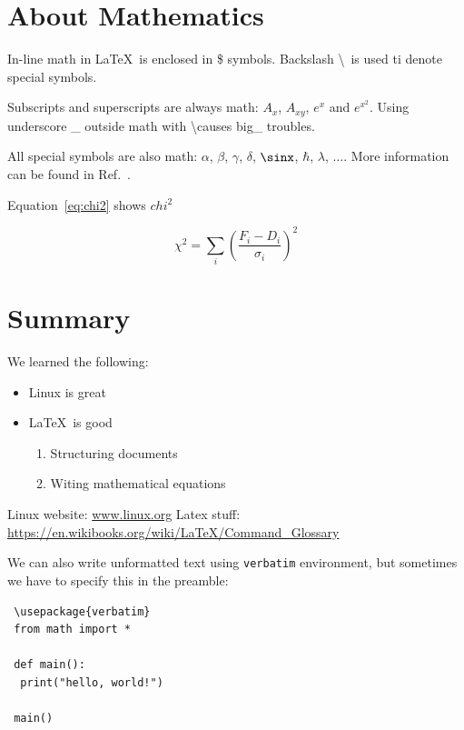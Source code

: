 \documentclass[a4paper,10pt,twoside]{article}
\begin{document}
\section{About Mathematics}
In-line math in \LaTeX \ is enclosed in \$ symbols. Backslash \textbackslash \
is used ti denote special symbols.

Subscripts and superscripts are always math: $A_x$, $A_{xy}$, $e^x$ and $e^{x^2}$. Using underscore \_ outside math with \textbackslash causes big\_ troubles.

All special symbols are also math: $\alpha$, $\beta$, $\gamma$, $\delta$, $\sinx$, $\hbar$, $\lambda$, $\ldots$. More information can be found in Ref.~\cite{latex}.

Equation~\ref{eq:chi2} shows $chi^2$

\begin{equation}
 \label{eq:chi2}
 \chi^2=\sum\limits_i \left(\frac{F_i-D_i}{\sigma_i}\right)^2
\end{equation}

\section{Summary}
\label{sec:sum}

We learned the following:
\begin{itemize}
 \item Linux is great
 \item \LaTeX \ is good
 \begin{enumerate}
  \item Structuring documents
  \item Witing mathematical equations
 \end{enumerate}

\end{itemize}


\begin{thebibliography}{99}
  Linux website: \url{www.linux.org}
  Latex stuff: \url{https://en.wikibooks.org/wiki/LaTeX/Command\_Glossary}
\end{thebibliography}

We can also write unformatted text using \texttt{verbatim} environment, but sometimes we have to specify this in the preamble:
\begin{verbatim}
 \usepackage{verbatim}
 from math import *
 
 def main():
  print("hello, world!")
  
 main()
\end{verbatim}
\end{document}
